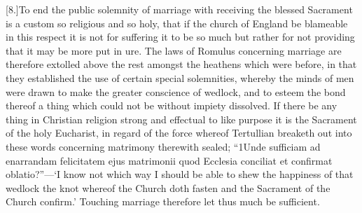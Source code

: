 [8.]To end the public solemnity of marriage with receiving the blessed Sacrament is a custom so religious and so holy, that if the church of England be blameable in this respect it is not for suffering it to be so much but rather for not providing that it may be more put in ure. The laws of Romulus concerning marriage are therefore extolled above the rest  amongst the heathens which were before,
 in that they established the use of certain special solemnities, whereby the minds of men were drawn to make the greater conscience of wedlock, and to esteem the bond thereof a thing which could not be without impiety dissolved. If there be any thing in Christian religion strong and effectual to like purpose it is the Sacrament of the holy Eucharist, in regard of the force whereof Tertullian breaketh out into these words concerning matrimony therewith sealed; “1Unde sufficiam ad enarrandam felicitatem ejus matrimonii quod Ecclesia conciliat et confirmat oblatio?”—‘I know not which way I should be able to shew the happiness of that wedlock the knot whereof the Church doth fasten and the Sacrament of the Church confirm.’ Touching marriage therefore let thus much be sufficient.



